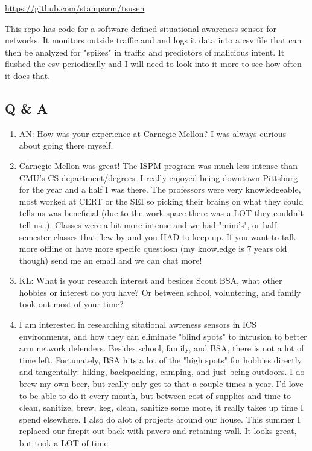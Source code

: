 \url{https://github.com/stamparm/tsusen} 

This repo has code for a software defined situational awareness sensor for networks. It monitors outside traffic and and logs it data into a csv file that can then be analyzed for "spikes" in traffic and predictors of malicious intent. It flushed the csv periodically and I will need to look into it more to see how often it does that.

\subsection{Q \& A}
    \begin{enumerate}
        \item AN: How was your experience at Carnegie Mellon? I was always curious about going there myself.

        \item Carnegie Mellon was great! The ISPM program was much less intense than CMU's CS department/degrees. I really enjoyed being downtown Pittsburg for the year and a half I was there. The professors were very knowledgeable, most worked at CERT or the SEI so picking their brains on what they could tells us was beneficial (due to the work space there was a LOT they couldn't tell us..). Classes were a bit more intense and we had "mini's", or half semester classes that flew by and you HAD to keep up. If you want to talk more offline or have more specifc questiosn (my knowledge is 7 years old though) send me an email and we can chat more!
        
        \item KL: What is your research interest and besides Scout BSA, what other hobbies or interest do you have? Or between school, voluntering, and family took out most of your time?
        
        \item I am interested in researching sitational awreness sensors in ICS environments, and how they can eliminate "blind spots" to intrusion to better arm network defenders. Besides school, family, and BSA, there is not a lot of time left. Fortunately, BSA hits a lot of the "high spots" for hobbies directly and tangentally: hiking, backpacking, camping, and just being outdoors. I do brew my own beer, but really only get to that a couple times a year. I'd love to be able to do it every month, but between cost of supplies and time to clean, sanitize, brew, keg, clean, sanitize some more, it really takes up time I spend elsewhere. I also do alot of projects around our house. This summer I replaced our firepit out back with pavers and retaining wall. It looks great, but took a LOT of time.
    
    \end{enumerate}
